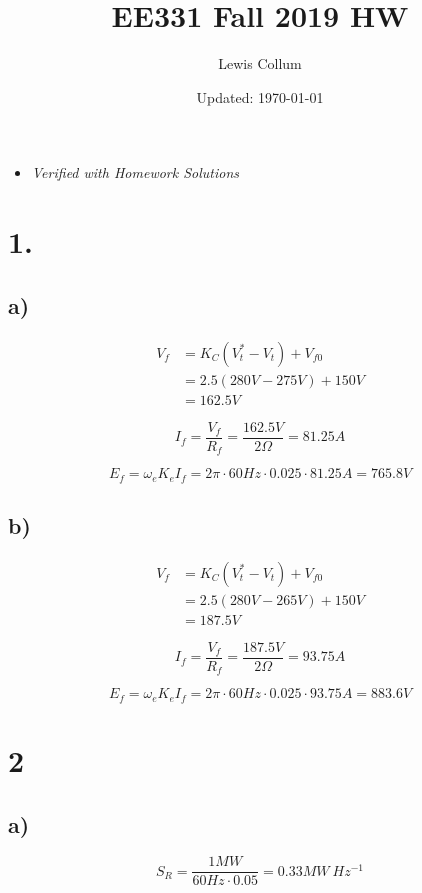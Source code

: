 \documentclass[fleqn, twocolumn]{article}
\author{Lewis Collum}
\date{Updated: \today}
\title{EE331 Fall 2019 HW \jobname}
\begin{document}
\maketitle
\begin{itemize}
\item \emph{Verified with Homework Solutions}
\end{itemize}

\section*{1.}
\label{sec:org97ae118}
\subsection*{a)}
\label{sec:org6dbfb4c}
\begin{align*}
  V_{f} &= K_{C} (V_{t}^* - V_{t}) + V_{f0} \\
  &= 2.5 (280\si{V} - 275\si{V}) + 150\si{V} \\
  &= \boxed{162.5\si{V}}
\end{align*}

\[I_{f} = \frac{V_f}{R_f} = \frac{162.5\si{V}}{2\si{\Omega}} = \boxed{81.25\si{A}}\]

\[E_f = \omega_e K_e I_f = 2\pi\cdot 60\si{Hz} \cdot 0.025 \cdot 81.25\si{A} = \boxed{765.8\si{V}}\]

\subsection*{b)}
\label{sec:orgc327e49}
\begin{align*}
  V_{f} &= K_{C} (V_{t}^* - V_{t}) + V_{f0} \\
  &= 2.5 (280\si{V} - 265\si{V}) + 150\si{V} \\
  &= \boxed{187.5\si{V}}
\end{align*}

\[I_{f} = \frac{V_f}{R_f} = \frac{187.5\si{V}}{2\si{\Omega}} = \boxed{93.75\si{A}}\]

\[E_f = \omega_e K_e I_f = 2\pi\cdot 60\si{Hz} \cdot 0.025 \cdot 93.75\si{A} = \boxed{883.6\si{V}}\]

\section*{2}
\label{sec:org4dfe21e}
\subsection*{a)}
\label{sec:orgd75adfc}
\[S_R = \frac{1\si{MW}}{60\si{Hz} \cdot 0.05} = \boxed{0.33\si{MW \ Hz^{-1}}}\]
\end{document}
